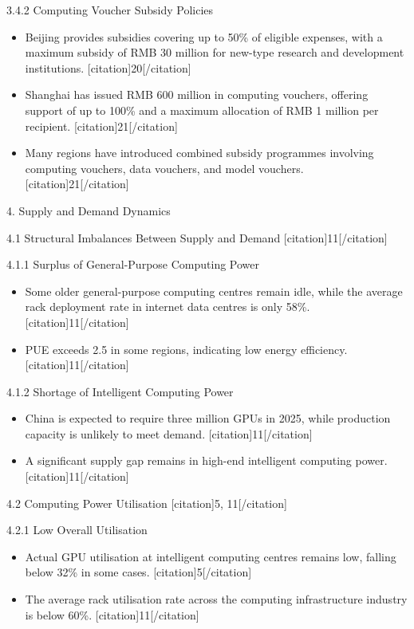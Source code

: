 \documentclass{huawei}
\begin{document}
\begin{tcolorbox}[
    title={Example of Hierarchical Research Outline},
    colback=gray!5,
    colframe=gray!40,
    fonttitle=\bfseries,
    boxrule=0.5pt,
    arc=2pt,
    breakable
]
\textcolor{TitleRed}{3.4.2 Computing Voucher Subsidy Policies}
\begin{itemize}[leftmargin=1em, listparindent=\parindent]
\item Beijing provides subsidies covering up to 50\% of eligible expenses, with a maximum subsidy of RMB 30 million for new-type research and development institutions. [citation]20[/citation]
\item Shanghai has issued RMB 600 million in computing vouchers, offering support of up to 100\% and a maximum allocation of RMB 1 million per recipient. [citation]21[/citation]
\item Many regions have introduced combined subsidy programmes involving computing vouchers, data vouchers, and model vouchers. [citation]21[/citation]
\end{itemize}

\textcolor{TitleRed}{4. Supply and Demand Dynamics}

\textcolor{TitleRed}{4.1 Structural Imbalances Between Supply and Demand [citation]11[/citation]}

\textcolor{TitleRed}{4.1.1 Surplus of General-Purpose Computing Power}
\begin{itemize}[leftmargin=1em, listparindent=\parindent]
\item Some older general-purpose computing centres remain idle, while the average rack deployment rate in internet data centres is only 58\%. [citation]11[/citation]
\item PUE exceeds 2.5 in some regions, indicating low energy efficiency. [citation]11[/citation]
\end{itemize}

\textcolor{TitleRed}{4.1.2 Shortage of Intelligent Computing Power}
\begin{itemize}[leftmargin=1em, listparindent=\parindent]
\item China is expected to require three million GPUs in 2025, while production capacity is unlikely to meet demand. [citation]11[/citation]
\item A significant supply gap remains in high-end intelligent computing power. [citation]11[/citation]
\end{itemize}

\textcolor{TitleRed}{4.2 Computing Power Utilisation [citation]5, 11[/citation]}

\textcolor{TitleRed}{4.2.1 Low Overall Utilisation}
\begin{itemize}[leftmargin=1em, listparindent=\parindent]
\item Actual GPU utilisation at intelligent computing centres remains low, falling below 32\% in some cases. [citation]5[/citation]
\item The average rack utilisation rate across the computing infrastructure industry is below 60\%. [citation]11[/citation]
\end{itemize}


\end{tcolorbox}
\end{document}
